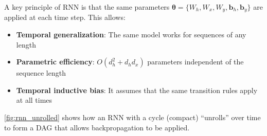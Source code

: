 A key principle of \gls{RNN} is that the same parameters $\boldsymbol{\theta} = \{W_h, W_x, W_y, \mathbf{b}_h, \mathbf{b}_y\}$ are applied at each time step. This allows:
\begin{itemize}
	\item \textbf{Temporal generalization}: The same model works for sequences of any length
	\item \textbf{Parametric efficiency}: $O(d_h^2 + d_h d_x)$ parameters independent of the sequence length
	\item \textbf{Temporal inductive bias}: It assumes that the same transition rules apply at all times
\end{itemize}

\autoref{fig:rnn_unrolled} shows how an RNN with a cycle (compact) ``unrolls'' over time to form a \gls{DAG} that allows backpropagation to be applied.

